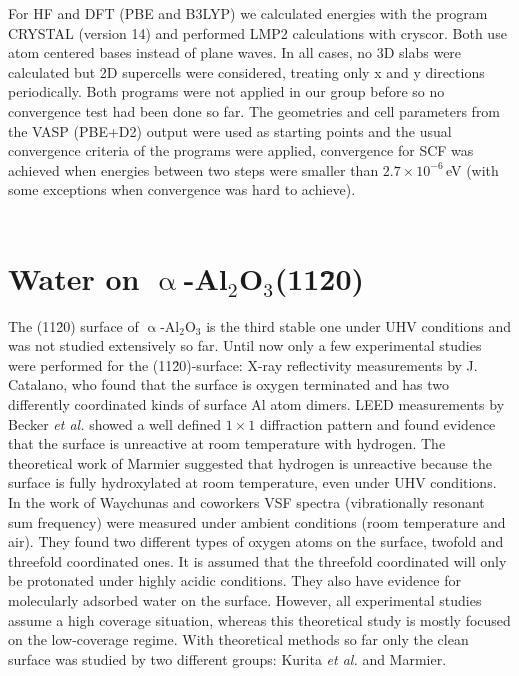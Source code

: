 \documentclass[11pt,DIV=13,BCOR=5mm,a4paper,headinclude]{scrbook}
\begin{document}
For HF and DFT (PBE and B3LYP) we calculated energies with the program CRYSTAL\cite{crystal14} (version 14) and performed LMP2 calculations with cryscor\cite{cryscor}.
Both use atom centered bases instead of plane waves.
In all cases, no 3D slabs were calculated but 2D supercells were considered, treating only x and y directions periodically.
Both programs were not applied in our group before so no convergence test had been done so far.
The geometries and cell parameters from the VASP (PBE+D2) output were used as starting points and the usual convergence criteria of the programs were applied, convergence for SCF was achieved when energies between two steps were smaller than $2.7\times 10^{-6}\,$eV (with some exceptions when convergence was hard to achieve).
\\\\


\chapter{Water on $\upalpha$-Al$_2$O$_3$(11\=20)}

The (11\=20) surface of $\upalpha$-Al$_2$O$_3$ is the third stable one under UHV conditions and was not studied extensively so far.
Until now only a few experimental studies were performed for the (11\=20)-surface: X-ray reflectivity measurements by J. Catalano\cite{catalano}, who found that the surface is oxygen terminated and has two differently coordinated kinds of surface Al atom dimers.
LEED measurements by Becker \textit{et al.}\cite{Becker2002} showed a well defined $1\times 1$ diffraction pattern and found evidence that the surface is unreactive at room temperature with hydrogen.
The theoretical work of Marmier\cite{marmier} suggested that hydrogen is unreactive because the surface is fully hydroxylated at room temperature, even under UHV conditions.
In the work of Waychunas and coworkers\cite{sung} VSF spectra (vibrationally resonant sum frequency) were measured under ambient conditions (room temperature and air).
They found two different types of oxygen atoms on the surface, twofold and threefold coordinated ones.
It is assumed that the threefold coordinated will only be protonated under highly acidic conditions.
They also have evidence for molecularly adsorbed water on the surface.
However, all experimental studies\cite{catalano,sung,Becker2002} assume a high coverage situation, whereas this theoretical study is mostly focused on the low-coverage regime.
With theoretical methods so far only the clean surface was studied by two different groups: Kurita \textit{et al.}\cite{kuri10} and Marmier\cite{marmier}.
\end{document}
